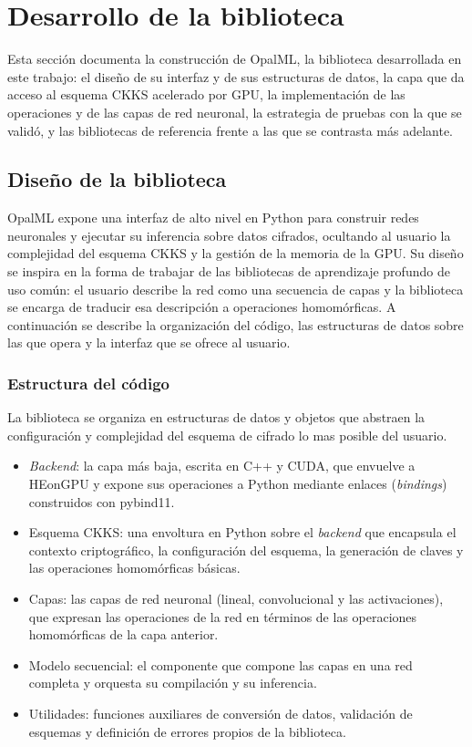 \section{Desarrollo de la biblioteca}\label{sec:metodo_desarrollo}

Esta sección documenta la construcción de OpalML, la biblioteca desarrollada en este trabajo: el diseño de su interfaz y de sus estructuras de datos, la capa que da acceso al esquema CKKS acelerado por GPU, la implementación de las operaciones y de las capas de red neuronal, la estrategia de pruebas con la que se validó, y las bibliotecas de referencia frente a las que se contrasta más adelante.

\subsection{Diseño de la biblioteca}\label{sec:metodo_diseno}

OpalML expone una interfaz de alto nivel en Python para construir redes neuronales y ejecutar su inferencia sobre datos cifrados, ocultando al usuario la complejidad del esquema CKKS y la gestión de la memoria de la GPU. Su diseño se inspira en la forma de trabajar de las bibliotecas de aprendizaje profundo de uso común: el usuario describe la red como una secuencia de capas y la biblioteca se encarga de traducir esa descripción a operaciones homomórficas. A continuación se describe la organización del código, las estructuras de datos sobre las que opera y la interfaz que se ofrece al usuario.

\subsubsection{Estructura del código}

La biblioteca se organiza en estructuras de datos y objetos que abstraen la configuración y complejidad del esquema de cifrado lo mas posible del usuario.

\begin{itemize}
    \item \textit{Backend}: la capa más baja, escrita en C++ y CUDA, que envuelve a HEonGPU y expone sus operaciones a Python mediante enlaces (\textit{bindings}) construidos con pybind11.
    \item Esquema CKKS: una envoltura en Python sobre el \textit{backend} que encapsula el contexto criptográfico, la configuración del esquema, la generación de claves y las operaciones homomórficas básicas.
    \item Capas: las capas de red neuronal (lineal, convolucional y las activaciones), que expresan las operaciones de la red en términos de las operaciones homomórficas de la capa anterior.
    \item Modelo secuencial: el componente que compone las capas en una red completa y orquesta su compilación y su inferencia.
    \item Utilidades: funciones auxiliares de conversión de datos, validación de esquemas y definición de errores propios de la biblioteca.
\end{itemize}

